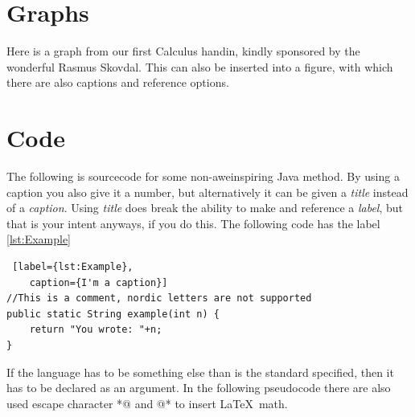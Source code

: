 \documentclass[a4, english]{article}
\begin{document}
\newpage
\section{Graphs}
Here is a graph from our first Calculus handin, kindly sponsored by the wonderful Rasmus Skovdal. \cite{rasmus} This can also be inserted into a figure, with which there are also captions and reference options.

\begin{center}
\end{center}

\section{Code}
The following is sourcecode for some non-aweinspiring Java method. By using a caption you also give it a number, but alternatively it can be given a \emph{title} instead of a \emph{caption}. Using \emph{title} does break the ability to make and reference a \emph{label}, but that is your intent anyways, if you do this. The following code has the label \ref{lst:Example}

\begin{lstlisting} [label={lst:Example},
	caption={I'm a caption}]
//This is a comment, nordic letters are not supported
public static String example(int n) {
	return "You wrote: "+n;
}
\end{lstlisting}

If the language has to be something else than is the standard specified, then it has to be declared as an argument. In the following pseudocode there are also used escape character *@ and @* to insert \LaTeX\ math.
\end{document}
